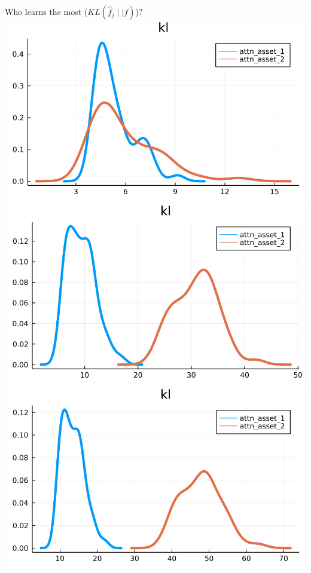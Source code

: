 \documentclass[
  ignorenonframetext,
]{beamer}
\begin{document}
\begin{frame}{Who learns the most (\(KL(\hat f_j \mid\mid f)\))?}
\protect\hypertarget{who-learns-the-most-klhat-f_j-midmid-f}{}
\includegraphics[width=0.4\paperheight]{complexity_files/figure-beamer/unnamed-chunk-20-1}
\includegraphics[width=0.4\paperheight]{complexity_files/figure-beamer/unnamed-chunk-20-2}
\includegraphics[width=0.4\paperheight]{complexity_files/figure-beamer/unnamed-chunk-20-3}

\end{frame}
\end{document}
